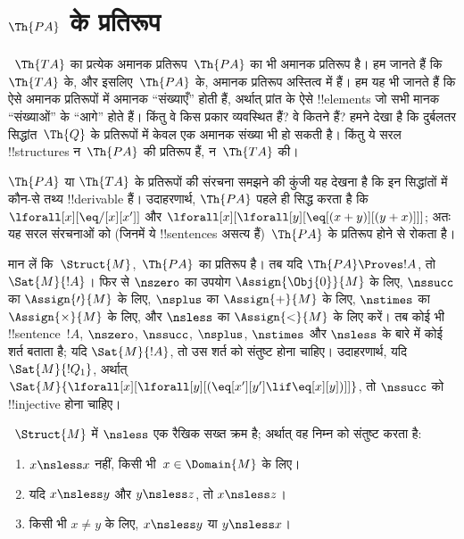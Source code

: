 \documentclass[../../../include/open-logic-section]{subfiles}
\begin{document}
\section{$\Th{PA}$ के प्रतिरूप}

\begin{explain}
~$\Th{TA}$ का प्रत्येक अमानक प्रतिरूप~$\Th{PA}$ का भी अमानक प्रतिरूप है।
हम जानते हैं कि~$\Th{TA}$ के, और इसलिए~$\Th{PA}$ के, अमानक प्रतिरूप
अस्तित्व में हैं। हम यह भी जानते हैं कि ऐसे अमानक प्रतिरूपों में अमानक
“संख्याएँ” होती हैं, अर्थात् प्रांत के ऐसे !!{element}s जो सभी मानक
“संख्याओं” के “आगे” होते हैं। किंतु वे किस प्रकार व्यवस्थित हैं? वे कितने
हैं? हमने देखा है कि दुर्बलतर सिद्धांत~$\Th{Q}$ के प्रतिरूपों में केवल एक
अमानक संख्या भी हो सकती है। किंतु ये सरल !!{structure}s न~$\Th{PA}$ की
प्रतिरूप हैं, न~$\Th{TA}$ की।

$\Th{PA}$ या $\Th{TA}$ के प्रतिरूपों की संरचना समझने की कुंजी यह देखना है
कि इन सिद्धांतों में कौन-से तथ्य !!{derivable} हैं। उदाहरणार्थ, $\Th{PA}$
पहले ही सिद्ध करता है कि $\lforall[x][\eq/[x][x']]$ और
$\lforall[x][\lforall[y][\eq[(x+y)][(y+x)]]]$; अतः यह सरल संरचनाओं को
(जिनमें ये !!{sentence}s असत्य हैं)~$\Th{PA}$ के प्रतिरूप होने से रोकता है।

मान लें कि~$\Struct{M}$,~$\Th{PA}$ का प्रतिरूप है। तब यदि
$\Th{PA} \Proves
!A$, तो $\Sat{M}{!A}$। फिर से $\nszero$ का उपयोग
$\Assign{\Obj{0}}{M}$ के लिए, $\nssucc$ का $\Assign{\prime}{M}$ के लिए,
$\nsplus$ का $\Assign{+}{M}$ के लिए, $\nstimes$ का
$\Assign{\times}{M}$ के लिए, और $\nsless$ का $\Assign{<}{M}$ के लिए करें।
तब कोई भी !!{sentence}~$!A$, $\nszero$,
$\nssucc$, $\nsplus$, $\nstimes$ और $\nsless$ के बारे में कोई शर्त
बताता है; यदि $\Sat{M}{!A}$, तो उस शर्त को संतुष्ट होना चाहिए। उदाहरणार्थ,
यदि $\Sat{M}{!Q_1}$, अर्थात्
$\Sat{M}{\lforall[x][\lforall[y][(\eq[x'][y'] \lif \eq[x][y])]]}$,
तो $\nssucc$ को !!{injective} होना चाहिए।
\end{explain}

\begin{prop}
~$\Struct{M}$ में $\nsless$ एक रैखिक सख्त क्रम है; अर्थात् वह निम्न को
संतुष्ट करता है:
\begin{enumerate}
\item $x \nsless x$ नहीं, किसी भी~$x \in \Domain{M}$ के लिए।
\item यदि $x \nsless y$ और $y \nsless z$, तो $x \nsless z$।
\item किसी भी $x \neq y$ के लिए, $x \nsless y$ या $y \nsless x$।
\end{enumerate}
\end{prop}
\end{document}
